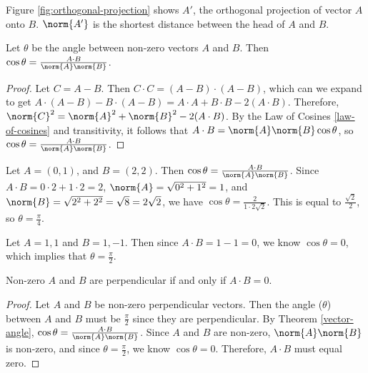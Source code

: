 \documentclass[12pt]{article}
\begin{document}
Figure \ref{fig:orthogonal-projection} shows $A'$, the orthogonal projection of vector $A$ onto $B$. $\norm{A'}$ is the shortest distance between the head of $A$ and $B$.

\begin{thm}
    Let $\theta$ be the angle between non-zero vectors $A$ and $B$. Then $\cos\theta = \frac{A \cdot B}{\norm{A}\norm{B}}$.
\end{thm}

\begin{proof}\label{vector-angle}
    Let $C = A - B$. Then $C \cdot C = (A - B) \cdot (A - B)$, which can we expand to get $A \cdot (A - B) - B \cdot (A - B) = A \cdot A + B \cdot B - 2(A \cdot B)$. Therefore, $\norm{C}^2 = \norm{A}^2 + \norm{B}^2 - 2(A \cdot B)$. By the Law of Cosines \ref{law-of-cosines} and transitivity, it follows that $A \cdot B = \norm{A}\norm{B}\cos\theta$, so $\cos\theta = \frac{A \cdot B}{\norm{A}\norm{B}}$.
\end{proof}

\begin{exmp}
    Let $A = \left(0, 1\right)$, and $B = \left(2, 2\right)$. Then $\cos\theta = \frac{A \cdot B}{\norm{A}\norm{B}}$. Since $A \cdot B = 0 \cdot 2 + 1 \cdot 2 = 2$, $\norm{A} = \sqrt{0^2 + 1^2} = 1$, and $\norm{B} = \sqrt{2^2 + 2^2} = \sqrt{8} = 2\sqrt{2}$, we have $\cos\theta = \frac{2}{1 \cdot 2\sqrt{2}}$. This is equal to $\frac{\sqrt{2}}{2}$, so $\theta = \frac{\pi}{4}$.
\end{exmp}

\begin{exmp}
    Let $A = {1, 1}$ and $B = {1, -1}$. Then since $A \cdot B = 1 - 1 = 0$, we know $\cos\theta = 0$, which implies that $\theta = \frac{\pi}{2}$.
\end{exmp}

\begin{cor}\label{perpendicular-vectors}
    Non-zero $A$ and $B$ are perpendicular if and only if $A \cdot B = 0$.
\end{cor}

\begin{proof}
    Let $A$ and $B$ be non-zero perpendicular vectors. Then the angle ($\theta$) between $A$ and $B$ must be $\frac{\pi}{2}$ since they are perpendicular. By Theorem \ref{vector-angle}, $\cos\theta = \frac{A \cdot B}{\norm{A}\norm{B}}$. Since $A$ and $B$ are non-zero, $\norm{A}\norm{B}$ is non-zero, and since $\theta = \frac{\pi}{2}$, we know $\cos\theta = 0$. Therefore, $A \cdot B$ must equal zero.
\end{proof}
\end{document}
